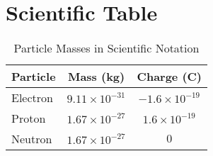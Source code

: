 \documentclass{article}
\begin{document}
\section*{Scientific Table}

\begin{table}[h!]
\centering
\caption{Particle Masses in Scientific Notation}
\label{tab:masses}
\begin{tabular}{lcc}
\toprule
\textbf{Particle} & \textbf{Mass (kg)} & \textbf{Charge (C)} \\ \midrule
Electron & $9.11 \times 10^{-31}$ & $-1.6 \times 10^{-19}$ \\
Proton & $1.67 \times 10^{-27}$ & $1.6 \times 10^{-19}$ \\
Neutron & $1.67 \times 10^{-27}$ & $0$ \\
\bottomrule
\end{tabular}
\end{table}
\end{document}
